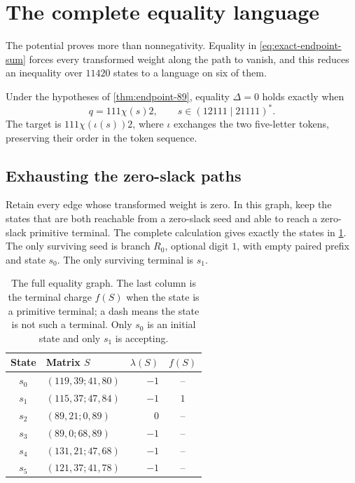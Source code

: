 \section{The complete equality language}
\label{sec:equality}

The potential proves more than nonnegativity. Equality in
\eqref{eq:exact-endpoint-sum} forces every transformed weight along the
path to vanish, and this reduces an inequality over $11420$ states to a
language on six of them.

\begin{theorem}
\label{thm:equality-language}
Under the hypotheses of \cref{thm:endpoint-89}, equality $\Delta=0$
holds exactly when
$$
 q=111\chi(s)2,\qquad s\in(12111\mid21111)^*.
$$
The target is $111\chi(\iota(s))2$, where $\iota$ exchanges the two
five-letter tokens, preserving their order in the token sequence.
\end{theorem}

\subsection{Exhausting the zero-slack paths}

Retain every edge whose transformed weight is zero. In this graph, keep
the states that are both reachable from a zero-slack seed and able to reach
a zero-slack primitive terminal. The complete calculation gives exactly
the states in \cref{tab:equality-states}. The only surviving seed is
branch $R_0$, optional digit $1$, with empty paired prefix and state $s_0$.
The only surviving terminal is $s_1$.

\begin{table}[htbp]
\centering
\caption{The full equality graph. The last column is the terminal charge
$f(S)$ when the state is a primitive terminal; a dash means the state is
not such a terminal. Only $s_0$ is an initial state and only $s_1$ is accepting.}
\label{tab:equality-states}
\begin{tabular}{clrc}
\toprule
State & Matrix $S$ & $\lambda(S)$ & $f(S)$\\
\midrule
$s_0$ & $(119,39;41,80)$ & $-1$ & --\\
$s_1$ & $(115,37;47,84)$ & $-1$ & $1$\\
$s_2$ & $(89,21;0,89)$ & $0$ & --\\
$s_3$ & $(89,0;68,89)$ & $-1$ & --\\
$s_4$ & $(131,21;47,68)$ & $-1$ & --\\
$s_5$ & $(121,37;41,78)$ & $-1$ & --\\
\bottomrule
\end{tabular}
\end{table}

